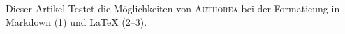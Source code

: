 Dieser Artikel Testet die Möglichkeiten von \textsc{Authorea} bei der Formatieung in Markdown (1) und LaTeX (2–3).

